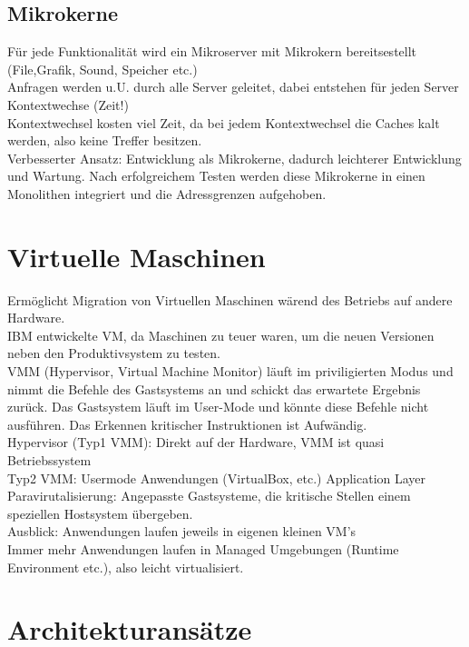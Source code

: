 \documentclass[a4paper]{article}
\begin{document}
\subsection{Mikrokerne}
Für jede Funktionalität wird ein Mikroserver mit Mikrokern bereitsestellt (File,Grafik, Sound, Speicher etc.)\\
Anfragen werden u.U. durch alle Server geleitet, dabei entstehen für jeden Server Kontextwechse (Zeit!)\\
Kontextwechsel kosten viel Zeit, da bei jedem Kontextwechsel die Caches kalt werden, also keine Treffer besitzen.\\
Verbesserter Ansatz: Entwicklung als Mikrokerne, dadurch leichterer Entwicklung und Wartung. Nach erfolgreichem Testen werden diese Mikrokerne in einen Monolithen integriert und die Adressgrenzen aufgehoben.\\
\section{Virtuelle Maschinen}
Ermöglicht Migration von Virtuellen Maschinen wärend des Betriebs auf andere Hardware.\\
IBM entwickelte VM, da Maschinen zu teuer waren, um die neuen Versionen neben den Produktivsystem zu testen.\\
VMM (Hypervisor, Virtual Machine Monitor) läuft im priviligierten Modus und nimmt die Befehle des Gastsystems an und schickt das erwartete Ergebnis zurück. Das Gastsystem läuft im User-Mode und könnte diese Befehle nicht ausführen. Das Erkennen kritischer Instruktionen ist Aufwändig.\\
Hypervisor (Typ1 VMM): Direkt auf der Hardware, VMM ist quasi Betriebssystem\\
Typ2 VMM: Usermode Anwendungen (VirtualBox, etc.) Application Layer\\
Paravirutalisierung: Angepasste Gastsysteme, die kritische Stellen einem speziellen Hostsystem übergeben.\\
Ausblick: Anwendungen laufen jeweils in eigenen kleinen VM's\\
Immer mehr Anwendungen laufen in Managed Umgebungen (Runtime Environment etc.), also leicht virtualisiert.\\
\section{Architekturansätze}
\end{document}
